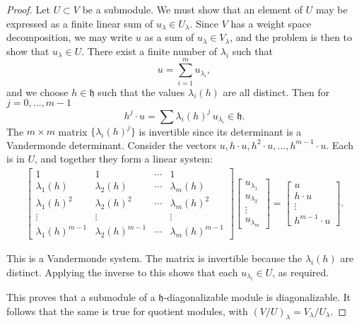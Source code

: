 \documentclass[12pt]{article}
\begin{document}
\begin{proof}
    Let $U \subset V$ be a submodule. We must show that an element of $U$ may be expressed as a finite linear sum of $u_\lambda \in U_\lambda$. Since $V$ has a weight space decomposition, we may write $u$ as a sum of $u_\lambda \in V_\lambda$, and the problem is then to show that $u_\lambda \in U$. There exist a finite number of $\lambda_i$ such that
    \[
        u = \sum_{i=1}^m u_{\lambda_i},
    \]
    and we choose $h \in \mathfrak{h}$ such that the values $\lambda_i(h)$ are all distinct. Then for $j=0,\dots,m-1$
    \[
        h^j \cdot u = \sum \lambda_i(h)^j \, u_{\lambda_i} \in \mathfrak{h}.
    \]
    The $m \times m$ matrix $\{ \lambda_i(h)^j \}$ is invertible since its determinant is a Vandermonde determinant. Consider the vectors $u, h \cdot u, h^2 \cdot u, \dots, h^{m-1}\cdot u.$ Each is in $U$, and together they form a linear system:
    \begin{align*}
        \begin{bmatrix}
            1                  & 1                  & \cdots & 1                  \\
            \lambda_1(h)       & \lambda_2(h)       & \cdots & \lambda_m(h)       \\
            \lambda_1(h)^2     & \lambda_2(h)^2     & \cdots & \lambda_m(h)^2     \\
            \vdots             & \vdots             &        & \vdots             \\
            \lambda_1(h)^{m-1} & \lambda_2(h)^{m-1} & \cdots & \lambda_m(h)^{m-1}
        \end{bmatrix}
        \begin{bmatrix}
            u_{\lambda_1} \\ u_{\lambda_2} \\ \vdots \\ u_{\lambda_m}
        \end{bmatrix} = \begin{bmatrix}
                            u \\ h\cdot u \\ \vdots \\ h^{m-1}\cdot u
                        \end{bmatrix}.
    \end{align*}

    This is a Vandermonde system. The matrix is invertible because the $\lambda_i(h)$ are distinct. Applying the inverse to this shows that each $u_{\lambda_i} \in U$, as required.

    This proves that a submodule of a $\mathfrak{h}$-diagonalizable module is diagonalizable. It follows that the same is true for quotient modules, with $(V/U)_\lambda = V_\lambda / U_\lambda$.
\end{proof}
\end{document}

